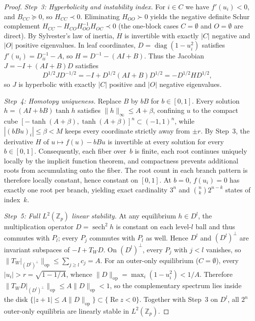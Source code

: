 \documentclass[11pt]{article}
\theoremstyle{plain}
\theoremstyle{definition}
\theoremstyle{remark}
\DeclareMathOperator{\diag}{diag}
\DeclareMathOperator{\sech}{sech}
\begin{document}
\begin{proof}
\emph{Step~3: Hyperbolicity and instability index.}
For $i \in C$ we have $f'(u_i) < 0$, and $B_{CC} \succeq 0$, so $H_{CC} \prec 0$. Eliminating $H_{OO} \succ 0$ yields the negative definite Schur complement $H_{CC} - H_{CO} H_{OO}^{-1} H_{OC} \prec 0$ (the one-block cases $C = \emptyset$ and $O = \emptyset$ are direct). By Sylvester's law of inertia, $H$ is invertible with exactly $|C|$ negative and $|O|$ positive eigenvalues. In leaf coordinates, $D = \diag(1 - u_i^2)$ satisfies $f'(u_i) = D_{ii}^{-1} - A$, so $H = D^{-1} - (AI + B)$. Thus the Jacobian $J = -I + (AI + B)D$ satisfies
\[
D^{1/2} J D^{-1/2} = -I + D^{1/2}(AI + B)D^{1/2} = -D^{1/2} H D^{1/2},
\]
so $J$ is hyperbolic with exactly $|C|$ positive and $|O|$ negative eigenvalues.

\emph{Step~4: Homotopy uniqueness.}
Replace $B$ by $bB$ for $b \in [0, 1]$. Every solution $h = (AI + bB)\tanh h$ satisfies $\|h\|_\infty \le A + \beta$, confining $u$ to the compact cube $[-\tanh(A + \beta), \tanh(A + \beta)]^n \subset (-1, 1)^n$, while $|(bBu)_i| \le \beta < M$ keeps every coordinate strictly away from $\pm r$. By Step~3, the derivative $H$ of $u \mapsto f(u) - bBu$ is invertible at every solution for every $b \in [0, 1]$. Consequently, each fiber over~$b$ is finite, each root continues uniquely locally by the implicit function theorem, and compactness prevents additional roots from accumulating onto the fiber. The root count in each branch pattern is therefore locally constant, hence constant on $[0, 1]$. At $b = 0$, $f(u_i) = 0$ has exactly one root per branch, yielding exact cardinality $3^n$ and $\binom{n}{k} 2^{n - k}$ states of index~$k$.

\emph{Step~5: Full $L^2(\mathbb{Z}_p)$ linear stability.}
At any equilibrium $h \in D^l$, the multiplication operator $D = \sech^2 h$ is constant on each level-$l$ ball and thus commutes with $P_l$; every $P_j$ commutes with $P_l$ as well. Hence $D^l$ and $(D^l)^\perp$ are invariant subspaces of $-I + T_W D$. On $(D^l)^\perp$, every $P_j$ with $j < l$ vanishes, so $\|T_W|_{(D^l)^\perp}\|_{\mathrm{op}} \le \sum_{j \ge l} c_j = A$. For an outer-only equilibrium ($C = \emptyset$), every $|u_i| > r = \sqrt{1 - 1/A}$, whence $\|D\|_{\mathrm{op}} = \max_i(1 - u_i^2) < 1/A$. Therefore $\|T_W D|_{(D^l)^\perp}\|_{\mathrm{op}} \le A\|D\|_{\mathrm{op}} < 1$, so the complementary spectrum lies inside the disk $\{|z + 1| \le A\|D\|_{\mathrm{op}}\} \subset \{\operatorname{Re} z < 0\}$. Together with Step~3 on $D^l$, all $2^n$ outer-only equilibria are linearly stable in $L^2(\mathbb{Z}_p)$.
\end{proof}
\end{document}
